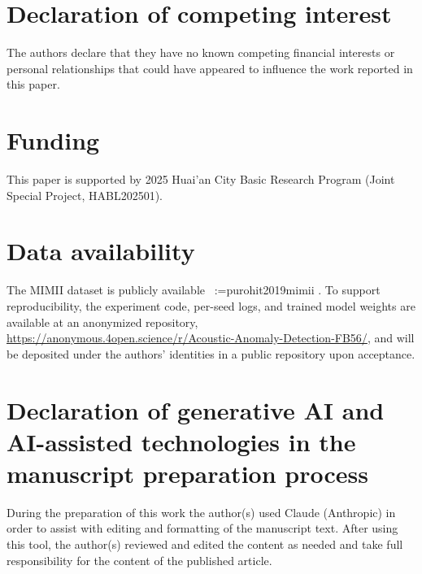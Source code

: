 \documentclass[review,nopreprintline]{elsarticle}
\makeatletter
\newif\ifmc@notfirst
\let\@oldcite\cite
\def\mc@splitcite#1{%
    \begingroup
    \mc@notfirstfalse
    \@for\@citekey:=#1\do{%
      \ifmc@notfirst, \fi
      \mc@notfirsttrue
      \@oldcite{\@citekey}%
    }%
    \endgroup
  }%
\def\cite#1{\protect\mc@splitcite{#1}}%
\makeatother
\begin{document}
\section*{Declaration of competing interest}
The authors declare that they have no known competing financial interests or personal relationships that could have appeared to influence the work reported in this paper.

\section*{Funding}
This paper is supported by 2025 Huai'an City Basic Research Program (Joint Special Project, HABL202501).

\section*{Data availability}
The MIMII dataset is publicly available~\cite{purohit2019mimii}. To support reproducibility, the experiment code, per-seed logs, and trained model weights are available at an anonymized repository, \url{https://anonymous.4open.science/r/Acoustic-Anomaly-Detection-FB56/}, and will be deposited under the authors' identities in a public repository upon acceptance.

\section*{Declaration of generative AI and AI-assisted technologies in the manuscript preparation process}
During the preparation of this work the author(s) used Claude (Anthropic) in order to assist with editing and formatting of the manuscript text. After using this tool, the author(s) reviewed and edited the content as needed and take full responsibility for the content of the published article.



\end{document}
